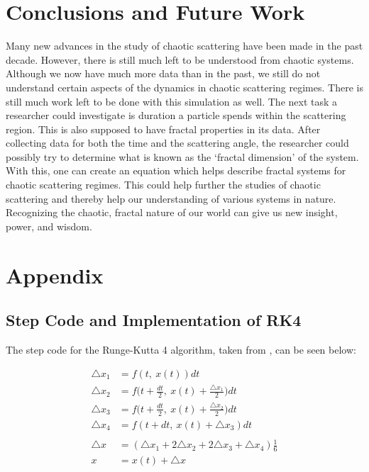 \documentclass[12pt]{article} %
\begin{document}

\section{Conclusions and Future Work} %
Many new advances in the study of chaotic scattering have been made in the past decade. However, there is still much left to be understood from chaotic systems. Although we now have much more data than in the past, we still do not understand certain aspects of the dynamics in chaotic scattering regimes. There is still much work left to be done with this simulation as well. The next task a researcher could investigate is duration a particle spends within the scattering region. This is also supposed to have fractal properties in its data. After collecting data for both the time and the scattering angle, the researcher could possibly try to determine what is known as the `fractal dimension' of the system. With this, one can create an equation which helps describe fractal systems for chaotic scattering regimes. This could help further the studies of chaotic scattering and thereby help our understanding of various systems in nature. Recognizing the chaotic, fractal nature of our world can give us new insight, power, and wisdom. 
\newpage




\section{Appendix}\label{sec:appendix}



\subsection{Step Code and Implementation of RK4}

\label{RK4}

The step code for the Runge-Kutta 4 algorithm, taken from \cite{OldRunge}, can be seen below:

\begin{align*} 
\triangle x_1 &= f ( t,\ x(t)) dt \\
\triangle x_2 &= f \bigg( t+\frac{dt}{2},\ x(t)+\frac{\triangle x_1}{2}\bigg) dt\\
\triangle x_3 &= f \bigg( t+\frac{dt}{2},\ x(t)+\frac{\triangle x_2}{2}\bigg) dt\\
\triangle x_4 &= f ( t+dt,\ x(t)+ \triangle x_3) dt\\
\\
\triangle x &= (\triangle x_1 + 2 \triangle x_2 + 2 \triangle x_3 + \triangle x_4) \frac{1}{6} \\
x &= x(t) + \triangle x 
\end{align*}
\end{document}
